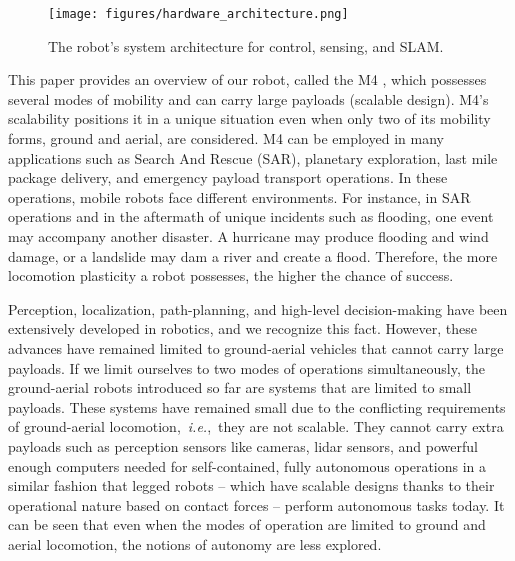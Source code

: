 \documentclass[letterpaper, 10 pt, conference]{ieeeconf}  %
\newcommand{\ie}{\emph{i.e.},}
\begin{document}
\begin{figure}[t]
\vspace{0.08in}
    \centering
    \texttt{[image: figures/hardware\_architecture.png]}
    \caption{The robot's system architecture for control, sensing, and SLAM.}
    \label{fig:system_architecture}
\vspace{-0.5cm}
\end{figure}

This paper provides an overview of our robot, called the M4 \cite{sihite2023multi, mandralis2023minimum}, which possesses several modes of mobility and can carry large payloads (scalable design). M4's scalability positions it in a unique situation even when only two of its mobility forms, ground and aerial, are considered. M4 can be employed in many applications such as Search And Rescue (SAR), planetary exploration, last mile package delivery, and emergency payload transport operations. In these operations, mobile robots face different environments. For instance, in SAR operations and in the aftermath of unique incidents such as flooding, one event may accompany another disaster. A hurricane may produce flooding and wind damage, or a landslide may dam a river and create a flood. Therefore, the more locomotion plasticity a robot possesses, the higher the chance of success. 


Perception, localization, path-planning, and high-level decision-making have been extensively developed in robotics, and we recognize this fact. However, these advances have remained limited to ground-aerial vehicles that cannot carry large payloads. If we limit ourselves to two modes of operations simultaneously, the ground-aerial robots introduced so far are systems that are limited to small payloads. These systems have remained small due to the conflicting requirements of ground-aerial locomotion,~\ie~they are not scalable. They cannot carry extra payloads such as perception sensors like cameras, lidar sensors, and powerful enough computers needed for self-contained, fully autonomous operations in a similar fashion that legged robots -- which have scalable designs thanks to their operational nature based on contact forces -- perform autonomous tasks today. It can be seen that even when the modes of operation are limited to ground and aerial locomotion, the notions of autonomy are less explored.  
\end{document}
